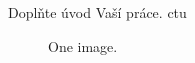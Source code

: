 \begin{introduction}
	Doplňte úvod Vaší práce.  \gls{ctu}
	
    \begin{figure}
        \centering
        \caption{One image. }
        \label{fig:TODO}
    \end{figure}
	
\end{introduction}